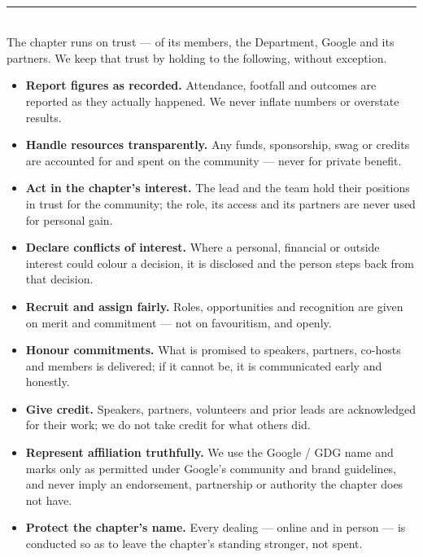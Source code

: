\documentclass[11pt,a4paper]{article}
\newcommand{\pill}[2]{\tikz[baseline]{\node[fill=#1,text=white,font=\bfseries\small,%
  rounded corners=3pt,inner xsep=7pt,inner ysep=2.5pt]{#2};}}
\begin{document}
\begin{tcolorbox}[enhanced,breakable,colback=white,colframe=Line,boxrule=0.6pt,arc=5pt,
    left=14pt,right=14pt,top=12pt,bottom=12pt,borderline west={3.5pt}{0pt}{GBlue},
    before skip=8pt,after skip=12pt]
  {\pill{GBlue}{01}}\;\\[8pt]
  {\color{Line}\rule{\linewidth}{0.5pt}}\\[7pt]
  
The chapter runs on trust — of its members, the Department, Google and its partners. We keep that
trust by holding to the following, without exception.
\begin{itemize}[leftmargin=1.4em,itemsep=3pt,topsep=2pt]
  \item \textbf{Report figures as recorded.} Attendance, footfall and outcomes are reported as they
        actually happened. We never inflate numbers or overstate results.
  \item \textbf{Handle resources transparently.} Any funds, sponsorship, swag or credits are accounted
        for and spent on the community — never for private benefit.
  \item \textbf{Act in the chapter's interest.} The lead and the team hold their positions in trust
        for the community; the role, its access and its partners are never used for personal gain.
  \item \textbf{Declare conflicts of interest.} Where a personal, financial or outside interest could
        colour a decision, it is disclosed and the person steps back from that decision.
  \item \textbf{Recruit and assign fairly.} Roles, opportunities and recognition are given on merit and
        commitment — not on favouritism, and openly.
  \item \textbf{Honour commitments.} What is promised to speakers, partners, co-hosts and members is
        delivered; if it cannot be, it is communicated early and honestly.
  \item \textbf{Give credit.} Speakers, partners, volunteers and prior leads are acknowledged for
        their work; we do not take credit for what others did.
  \item \textbf{Represent affiliation truthfully.} We use the Google / GDG name and marks only as
        permitted under Google's community and brand guidelines, and never imply an endorsement,
        partnership or authority the chapter does not have.
  \item \textbf{Protect the chapter's name.} Every dealing — online and in person — is conducted so as
        to leave the chapter's standing stronger, not spent.
\end{itemize}
\end{tcolorbox}
\end{document}
